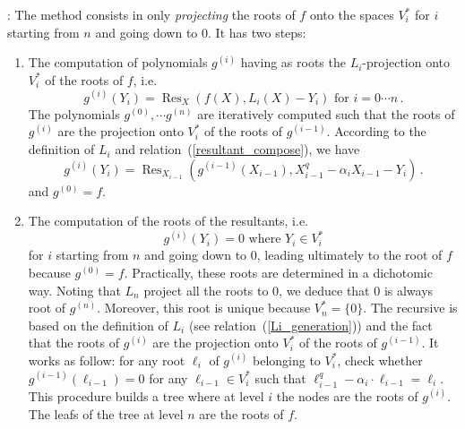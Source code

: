 \documentclass{sig-alternate}
\DeclareMathOperator{\Res}{Res}
\begin{document}
\medskip

: The method consists in only \emph{projecting} the roots of $f$ onto the spaces $V_i^\ast$ for $i$ starting from $n$ and going down to 0.
It has two steps:
\begin{enumerate}
\item The computation of polynomials $g^{(i)}$ having as roots the $L_i$-projection onto $V_i^\ast$ of the roots of $f$,  i.e.
  $$g^{(i)}(Y_i)=\Res_{X}(f(X), L_i(X)-Y_i )  \mbox{ for }i=0 \cdots n \,.$$
  The polynomials $g^{(0)}, \cdots g^{(n)}$ are iteratively computed such that the roots of $g^{(i)}$ are the projection onto 
  $V_i^\ast$ of the roots of $g^{(i-1)}$. According to the definition of $L_i$ and relation~(\ref{resultant_compose}), we have
  $$g^{(i)}(Y_i)=\Res_{X_{i-1}}(g^{(i-1)}(X_{i-1}),X^q_{i-1} - \alpha_i X_{i-1} -Y_i ) \,.$$
 and $g ^{(0)}=f$.
\item The computation of the roots of the resultants, i.e.
$$g^{(i)}(Y_i)=0  \mbox{ where }  Y_i \in   V_i^\ast$$
for $i$ starting from $n$ and going down to 0, leading ultimately to the root of $f$ because $g^{(0)}=f$. Practically, these roots 
are determined in a dichotomic way. Noting that $L_n$ project all the roots to $0$,
 we deduce that $0$ is always root of $g^{(n)}$. Moreover, this root is unique because $V_n^\ast=\{0\}$.
The recursive is based on the definition of $L_i$ (see relation~(\ref{Li_generation})) and the fact that the roots of $g^{(i)}$ are the projection onto 
  $V_i^\ast$ of the roots of $g^{(i-1)}$. It works as follow: for any root $\ell_i$ of $g^{(i)}$ belonging to $V_i^\ast$, check whether $g^{(i-1)}(\ell_{i-1})=0$
   for any $\ell_{i-1} \in V_i^\ast$ such that $\ell_{i-1}^q-\alpha_i \cdot \ell_{i-1}=\ell_i$. This procedure builds a tree where at level $i$ the nodes are the roots of $g^{(i)}$. 
   The leafs of the tree at level $n$ are the roots of $f$.
\end{enumerate}
  
\end{document}
